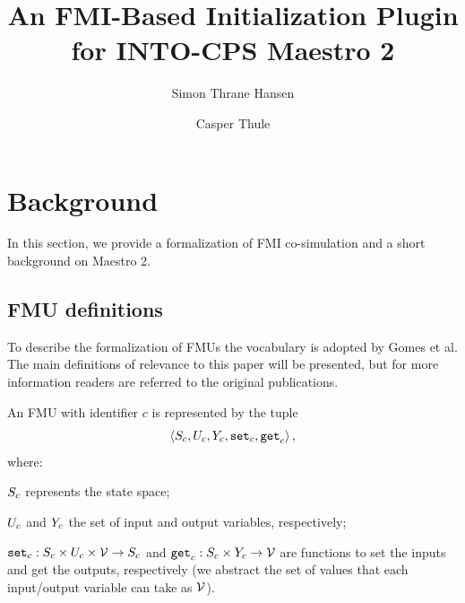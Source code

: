 \documentclass[runningheads]{llncs}
\begin{document}
%
\title{An FMI-Based Initialization Plugin for INTO-CPS Maestro 2}
%
%
\author{Simon Thrane Hansen \and
Casper Thule}
%
%
%
\maketitle              %
%






\section{Background}\label{sc:background}
In this section, we provide a formalization of FMI co-simulation and a short background on Maestro 2.

\subsection{FMU definitions}
To describe the formalization of FMUs the vocabulary is adopted by Gomes et al\cite{gomes_lucio_vangheluwe_2019, Gomes2018}. The main definitions of relevance to this paper will be presented, but for more information readers are referred to the original publications. 
\begin{definition}[FMU]\label{def:fmu}
  An FMU with identifier $c$ is represented by the tuple   
  $$ \left\langle S_{c}, U_{c}, Y_{c}, \mathtt{set}_{c}, \mathtt{get}_{c} \right\rangle ,$$
  where:
  \begin{inparadesc}
    \item $S_{c}$ represents the state space;
    \item $U_{c}$ and $Y_{c}$ the set of input and output variables, respectively;
    \item $\mathtt{set}_{c} : S_{c} \times U_{c} \times \mathcal{V} \to S_{c}$ and $\mathtt{get}_{c}: S_{c} \times Y_{c} \to \mathcal{V}$ are functions to set the inputs and get the outputs, respectively (we abstract the set of values that each input/output variable can take as $\mathcal{V}$).
  \end{inparadesc}
\end{definition}
\end{document}
